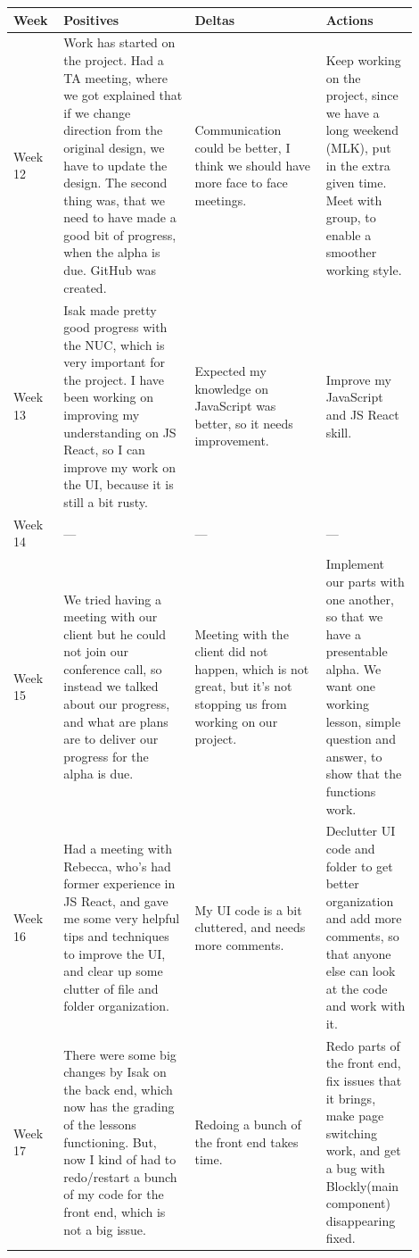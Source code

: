 \documentclass[draftclsnofoot,10pt,onecolumn]{IEEEtran}
\begin{document}
        \newpage
        \begin{tabular}{p{0.1\linewidth}p{0.3\linewidth}p{0.3\linewidth}p{0.2\linewidth}}
        \hline
            \textbf{Week}
             & \textbf{Positives}
             & \textbf{Deltas}
             & \textbf{Actions}\\
             \hline
             Week 12
             & Work has started on the project. Had a TA meeting, where we got explained that if we change direction from the original design, we have to update the design. The second thing was, that we need to have made a good bit of progress, when the alpha is due. GitHub was created.
             & Communication could be better, I think we should have more face to face meetings.
             & Keep working on the project, since we have a long weekend (MLK), put in the extra given time. Meet with group, to enable a smoother working style.\\
             \hline
             Week 13
             & Isak made pretty good progress with the NUC, which is very important for the project. I have been working on improving my understanding on JS React, so I can improve my work on the UI, because it is still a bit rusty.
             & Expected my knowledge on JavaScript was better, so it needs improvement.
             & Improve my JavaScript and JS React skill.\\
             \hline
             Week 14
             & ---
             & ---
             & ---\\
             \hline
             Week 15
             & We tried having a meeting with our client but he could not join our conference call, so instead we talked about our progress, and what are plans are to deliver our progress for the alpha is due.
             & Meeting with the client did not happen, which is not great, but it’s not stopping us from working on our project.
             & Implement our parts with one another, so that we have a presentable alpha. We want one working lesson, simple question and answer, to show that the functions work.\\
             \hline
             Week 16
             & Had a meeting with Rebecca, who’s had former experience in JS React, and gave me some very helpful tips and techniques to improve the UI, and clear up some clutter of file and folder organization.
             & My UI code is a bit cluttered, and needs more comments.
             & Declutter UI code and folder to get better organization and add more comments, so that anyone else can look at the code and work with it.\\
             \hline
             Week 17
             & There were some big changes by Isak on the back end, which now has the grading of the lessons functioning. But, now I kind of had to redo/restart a bunch of my code for the front end, which is not a big issue.
             & Redoing a bunch of the front end takes time.
             & Redo parts of the front end, fix issues that it brings, make page switching work, and get a bug with Blockly(main component) disappearing fixed.\\
             \end{tabular}
\end{document}
